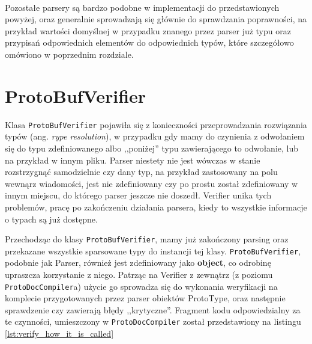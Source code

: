 \documentclass[pdflatex,11pt]{aghdpl}
\begin{document}
~\\\*

Pozostałe parsery są bardzo podobne w implementacji do przedstawionych powyżej, oraz generalnie sprowadzają się głównie do sprawdzania poprawności,
na przykład wartości domyślnej w przypadku znanego przez parser już typu oraz przypisań odpowiednich elementów do odpowiednich typów, które szczegółowo omówiono w poprzednim rozdziale.


% 
% 
% 


\section{ProtoBufVerifier}
Klasa \verb|ProtoBufVerifier| pojawiła się z konieczności przeprowadzania rozwiązania typów (ang. \textit{rype resolution}),
w przypadku gdy mamy do czynienia z odwołaniem się do typu zdefiniowanego albo ,,poniżej'' typu zawierającego to odwołanie,
lub na przykład w innym pliku. Parser niestety nie jest wówczas w stanie rozstrzygnąć samodzielnie czy dany typ, na przykład zastosowany na polu wewnąrz wiadomości,
jest nie zdefiniowany czy po prostu został zdefiniowany w innym miejscu, do którego parser jeszcze nie doszedł. Verifier unika tych problemów, pracę po zakończeniu 
działania parsera, kiedy to wszystkie informacje o typach są już dostępne.

Przechodząc do klasy \verb|ProtoBufVerifier|, mamy już zakończony parsing oraz przekazane wszystkie sparsowane typy do instancji tej klasy.
\verb|ProtoBufVerifier|, podobnie jak Parser, również jest zdefiniowany jako \textbf{object}, co odrobinę upraszcza korzystanie z niego.
Patrząc na Verifier z zewnątrz (z poziomu \verb|ProtoDocCompiler|a) użycie go sprowadza się do wykonania weryfikacji na komplecie 
przygotowanych przez parser obiektów ProtoType, oraz następnie sprawdzenie czy zawierają błędy ,,krytyczne''. 
Fragment kodu odpowiedzialny za te czynności, umieszczony w \verb|ProtoDocCompiler| został przedstawiony na listingu \ref{lst:verify_how_it_is_called}
\end{document}
